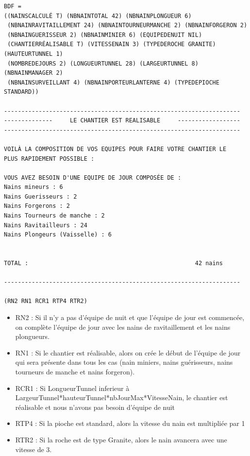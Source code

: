 \documentclass[a4paper,10pt]{report}
\begin{document}
  \begin{lstlisting}[basicstyle = \footnotesize]
BDF = 
((NAINSCALCULÉ T) (NBNAINTOTAL 42) (NBNAINPLONGUEUR 6)
 (NBNAINRAVITAILLEMENT 24) (NBNAINTOURNEURMANCHE 2) (NBNAINFORGERON 2)
 (NBNAINGUERISSEUR 2) (NBNAINMINIER 6) (EQUIPEDENUIT NIL)
 (CHANTIERRÉALISABLE T) (VITESSENAIN 3) (TYPEDEROCHE GRANITE) (HAUTEURTUNNEL 1)
 (NOMBREDEJOURS 2) (LONGUEURTUNNEL 28) (LARGEURTUNNEL 8) (NBNAINMANAGER 2)
 (NBNAINSURVEILLANT 4) (NBNAINPORTEURLANTERNE 4) (TYPEDEPIOCHE STANDARD))

--------------------------------------------------------------------
--------------     LE CHANTIER EST REALISABLE     ------------------
--------------------------------------------------------------------

VOILÀ LA COMPOSITION DE VOS EQUIPES POUR FAIRE VOTRE CHANTIER LE 
PLUS RAPIDEMENT POSSIBLE : 

VOUS AVEZ BESOIN D'UNE EQUIPE DE JOUR COMPOSÉE DE : 
Nains mineurs : 6
Nains Guerisseurs : 2
Nains Forgerons : 2
Nains Tourneurs de manche : 2
Nains Ravitailleurs : 24
Nains Plongeurs (Vaisselle) : 6


TOTAL :                                                42 nains

--------------------------------------------------------------------

(RN2 RN1 RCR1 RTP4 RTR2)
\end{lstlisting}

\begin{itemize}
     \item RN2 : Si il n'y a pas d'équipe de nuit et que l'équipe de jour est commencée, on complète l'équipe de jour avec les nains de ravitaillement et les nains plongueurs.
     \item RN1 : Si le chantier est réalisable, alors on crée le début de l'équipe de jour qui sera présente dans tous les cas (nain miniers, nains guérisseurs, nains tourneurs de manche et nains forgeron).
     \item RCR1 : Si LongueurTunnel inferieur à LargeurTunnel*hauteurTunnel*nbJourMax*VitesseNain, le chantier est réalisable et nous n'avons pas besoin d'équipe de nuit
     \item RTP4 : Si la pioche est standard, alors la vitesse du nain est multipliée par 1
     \item RTR2 : Si la roche est de type Granite, alors le nain avancera avec une vitesse de 3.
\end{itemize}
  
\end{document}
